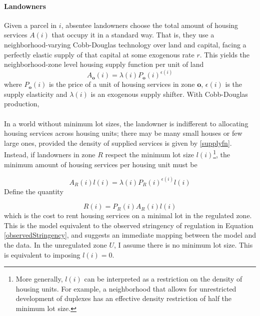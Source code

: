 \documentclass[12pt]{article}
\begin{document}
	\paragraph*{Landowners}  Given a parcel in $i$, absentee landowners choose the total amount of housing services $A(i)$ that occupy it in a standard way. That is, they use a neighborhood-varying Cobb-Douglas technology over land and capital, facing a perfectly elastic supply of that capital at some exogenous rate $r$. This yields the neighborhood-zone level housing supply function per unit of land
	\begin{equation}\label{supplyfn}
		A_{\boldsymbol{o}}(i) = \lambda(i)P_{\boldsymbol{o}}(i)^{\epsilon(i)}
	\end{equation}
	where $P_{\boldsymbol{o}}(i)$ is the price of a unit of housing services in zone $\boldsymbol{o}$, $\epsilon(i)$ is the supply elasticity and $\lambda(i)$ is an exogenous supply shifter. With Cobb-Douglas production, 
	
	\paragraph*{}
	 In a world without minimum lot sizes, the landowner is indifferent to allocating housing services across housing units; there may be many small houses or few large ones, provided the density of supplied services is given by \eqref{supplyfn}. Instead, if landowners in zone $R$ respect the minimum lot size $l(i)$\footnote{More generally, $l(i)$ can be interpreted as a restriction on the density of housing units. For example, a neighborhood that allows for unrestricted development of duplexes has an effective density restriction of half the minimum lot size.}, the minimum amount of housing services per housing unit must be

	\begin{equation}\label{minstructure}
		A_{R}(i)l(i) = \lambda(i)P_{R}(i)^{\epsilon(i)}l(i)
	\end{equation}
	Define the quantity 
	
	\begin{equation}\label{stringency}
		R(i) = P_{R}(i)A_{R}(i)l(i)
	\end{equation}
	which is the cost to rent housing services on a minimal lot in the regulated zone. This is the model equivalent to the observed stringency of regulation in Equation \eqref{observedStringency}, and suggests an immediate mapping between the model and the data. In the unregulated zone $U$, I assume there is no minimum lot size. This is equivalent to imposing $l(i) = 0$. 
	
\end{document}
